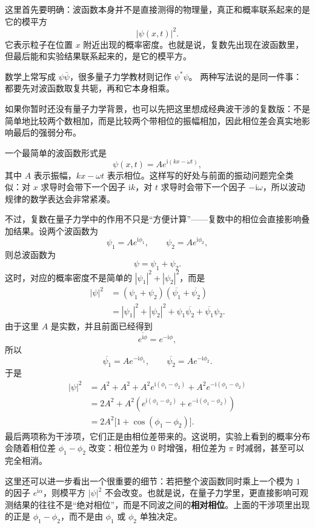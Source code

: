 这里首先要明确：波函数本身并不是直接测得的物理量，真正和概率联系起来的是它的模平方
\[
|\psi(x,t)|^2.
\]
它表示粒子在位置 $x$ 附近出现的概率密度。也就是说，复数先出现在波函数里，但最后能和实验结果联系起来的，是它的模平方。

数学上常写成 $\psi\bar\psi$，很多量子力学教材则记作 $\psi^*\psi$。
两种写法说的是同一件事：都要先对波函数取复共轭，再和它本身相乘。

如果你暂时还没有量子力学背景，也可以先把这里想成经典波干涉的复数版：不是简单地比较两个数相加，而是比较两个带相位的振幅相加，因此相位差会真实地影响最后的强弱分布。

一个最简单的波函数形式是
\[
\psi(x,t)=Ae^{\mathrm{i}(kx-\omega t)},
\]
其中 $A$ 表示振幅，$kx-\omega t$ 表示相位。这样写的好处与前面的振动问题完全类似：对 $x$ 求导时会带下一个因子 $\mathrm{i}k$，对 $t$ 求导时会带下一个因子 $-\mathrm{i}\omega$，所以波动规律的数学表达会非常紧凑。

不过，复数在量子力学中的作用不只是``方便计算''——复数中的相位会直接影响叠加结果。设两个波函数为
\[
\psi_1=Ae^{\mathrm{i}\phi_1},\qquad \psi_2=Ae^{\mathrm{i}\phi_2},
\]
则总波函数为
\[
\psi=\psi_1+\psi_2.
\]
这时，对应的概率密度不是简单的 $|\psi_1|^2+|\psi_2|^2$，而是
\[
\begin{aligned}
|\psi|^2
&=(\psi_1+\psi_2)(\overline{\psi_1}+\overline{\psi_2})\\
&=|\psi_1|^2+|\psi_2|^2+\psi_1\overline{\psi_2}+\overline{\psi_1}\psi_2.
\end{aligned}
\]
由于这里 $A$ 是实数，并且前面已经得到
\[
\overline{e^{\mathrm{i}\phi}}=e^{-\mathrm{i}\phi},
\]
所以
\[
\overline{\psi_1}=Ae^{-\mathrm{i}\phi_1},\qquad
\overline{\psi_2}=Ae^{-\mathrm{i}\phi_2}.
\]
于是
\[
\begin{aligned}
|\psi|^2
&=A^2+A^2+A^2e^{\mathrm{i}(\phi_1-\phi_2)}+A^2e^{-\mathrm{i}(\phi_1-\phi_2)} \\
&=2A^2+A^2\left(e^{\mathrm{i}(\phi_1-\phi_2)}+e^{-\mathrm{i}(\phi_1-\phi_2)}\right) \\
&=2A^2\bigl[1+\cos(\phi_1-\phi_2)\bigr].
\end{aligned}
\]
最后两项称为干涉项，它们正是由相位差带来的。这说明，实验上看到的概率分布会随着相位差 $\phi_1-\phi_2$ 改变：相位差为 $0$ 时增强，相位差为 $\pi$ 时减弱，甚至可以完全相消。

\begin{zhu}{}{}
这里还可以进一步看出一个很重要的细节：若把整个波函数同时乘上一个模为 $1$ 的因子 $e^{\mathrm{i}\alpha}$，则模平方 $|\psi|^2$ 不会改变。也就是说，在量子力学里，更直接影响可观测结果的往往不是``绝对相位''，而是不同波之间的\textbf{相对相位}。上面的干涉项里出现的正是 $\phi_1-\phi_2$，而不是由 $\phi_1$ 或 $\phi_2$ 单独决定。
\end{zhu}

